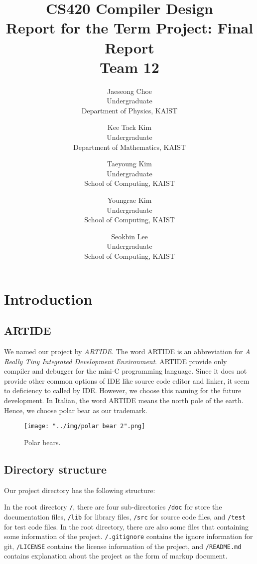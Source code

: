 \documentclass{article}
\title
{
	CS420 Compiler Design\\
	Report for the Term Project: Final Report\\
	${}$\\
	Team 12
}
\author
{
	Jaeseong Choe\\
	Undergraduate\\
	Department of Physics, KAIST
	\and
	Kee Tack Kim\\
	Undergraduate\\
	Department of Mathematics, KAIST
	\and
	Taeyoung Kim\\
	Undergraduate\\
	School of Computing, KAIST
	\and
	Youngrae Kim\\
	Undergraduate\\
	School of Computing, KAIST
	\and
	Seokbin Lee\\
	Undergraduate\\
	School of Computing, KAIST
}
\newcommand{\code}[1]{\texttt{#1}}
\begin{document}
	\maketitle
	
	\section{Introduction}
	
	\subsection{ARTIDE}
	
	We named our project by \emph{ARTIDE}. The word ARTIDE is an abbreviation for \emph{A Really Tiny Integrated Development Environment}. ARTIDE provide only compiler and debugger for the mini-C programming language. Since it does not provide other common options of IDE like source code editor and linker, it seem to deficiency to called by IDE. However, we choose this naming for the future development. In Italian, the word ARTIDE means the north pole of the earth. Hence, we choose polar bear as our trademark.
	
	\begin{figure}
		\centering
		\texttt{[image: "../img/polar bear 2".png]}
		\caption{Polar bears.}
		\label{fig: polar bears}
	\end{figure}
	
	\subsection{Directory structure}
	
	Our project directory has the following structure:
	
	In the root directory \code{/}, there are four sub-directories \code{/doc} for store the documentation files, \code{/lib} for library files, \code{/src} for source code files, and \code{/test} for test code files. In the root directory, there are also some files that containing some information of the project. \code{/.gitignore} contains the ignore information for git, \code{/LICENSE} contains the license information of the project, and \code{/README.md} contains explanation about the project as the form of markup document.
	
\end{document}
